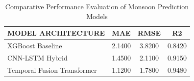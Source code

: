 \begin{table}
\caption{Comparative Performance Evaluation of Monsoon Prediction Models}
\label{tab:model_performance}
\begin{tabular}{|l|c|c|c|}
\toprule
MODEL ARCHITECTURE & MAE & RMSE & R2 \\
\midrule
XGBoost Baseline & 2.1400 & 3.8200 & 0.8420 \\
CNN-LSTM Hybrid & 1.4500 & 2.1100 & 0.9150 \\
Temporal Fusion Transformer & 1.1200 & 1.7800 & 0.9480 \\
\bottomrule
\end{tabular}
\end{table}
